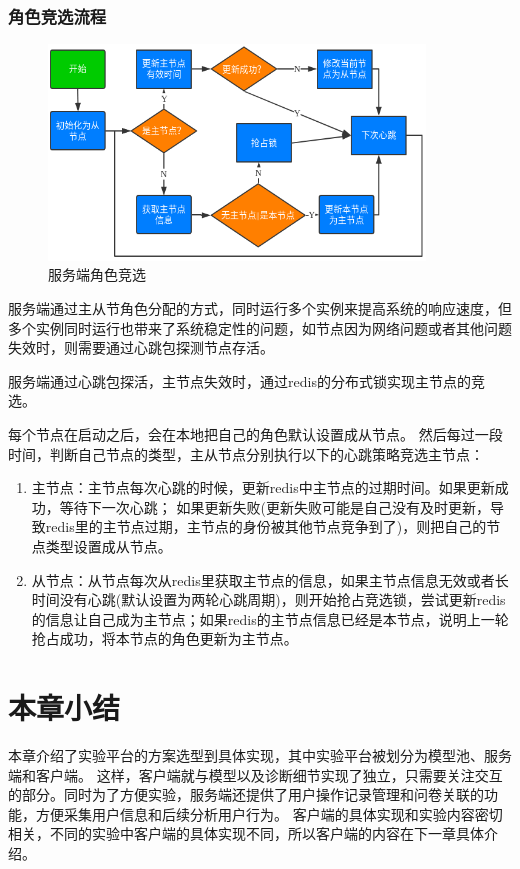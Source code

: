 \subsubsection{角色竞选流程}
\begin{figure}
    \centering
    \includegraphics[width=10cm]{images/slave-master.png}
    \caption{服务端角色竞选}
    \label{fig:slave_master}
\end{figure}

服务端通过主从节角色分配的方式，同时运行多个实例来提高系统的响应速度，但多个实例同时运行也带来了系统稳定性的问题，如节点因为网络问题或者其他问题失效时，则需要通过心跳包探测节点存活。

服务端通过心跳包探活，主节点失效时，通过redis的分布式锁实现主节点的竞选。

每个节点在启动之后，会在本地把自己的角色默认设置成从节点。
然后每过一段时间，判断自己节点的类型，主从节点分别执行以下的心跳策略竞选主节点：

\begin{enumerate}
    \item 主节点：主节点每次心跳的时候，更新redis中主节点的过期时间。如果更新成功，等待下一次心跳； 如果更新失败(更新失败可能是自己没有及时更新，导致redis里的主节点过期，主节点的身份被其他节点竞争到了)，则把自己的节点类型设置成从节点。
    
    \item 从节点：从节点每次从redis里获取主节点的信息，如果主节点信息无效或者长时间没有心跳(默认设置为两轮心跳周期)，则开始抢占竞选锁，尝试更新redis的信息让自己成为主节点；如果redis的主节点信息已经是本节点，说明上一轮抢占成功，将本节点的角色更新为主节点。 
\end{enumerate}



\section{本章小结}
本章介绍了实验平台的方案选型到具体实现，其中实验平台被划分为模型池、服务端和客户端。
这样，客户端就与模型以及诊断细节实现了独立，只需要关注交互的部分。同时为了方便实验，服务端还提供了用户操作记录管理和问卷关联的功能，方便采集用户信息和后续分析用户行为。
客户端的具体实现和实验内容密切相关，不同的实验中客户端的具体实现不同，所以客户端的内容在下一章具体介绍。
